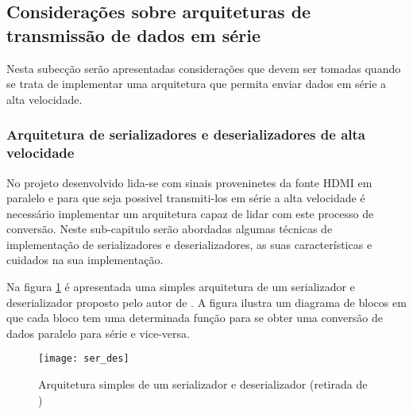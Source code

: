 %

\subsection{Considerações sobre arquiteturas de transmissão de dados em série} \label{serial_theory}
Nesta subecção serão apresentadas considerações que devem ser tomadas quando se trata de implementar uma arquitetura que permita enviar dados em série a alta velocidade.
\subsubsection*{Arquitetura de serializadores e deserializadores de alta velocidade}

No projeto desenvolvido lida-se com sinais proveninetes da fonte HDMI em paralelo e para que seja possivel transmiti-los em série a alta velocidade é necessário implementar um arquitetura capaz de lidar com este processo de conversão. Neste sub-capitulo serão abordadas algumas técnicas de implementação de serializadores e deserializadores, as suas características e cuidados na sua implementação.

Na figura \ref{fig:arquiteturaSER} é apresentada uma simples arquitetura de um serializador e deserializador proposto pelo autor de \cite{R032}. A figura ilustra um diagrama de blocos em que cada bloco tem uma determinada função para se obter uma conversão de dados paralelo para série e vice-versa.

\begin{figure}[h!]
	\begin{center}
		\leavevmode
		\texttt{[image: ser\_des]}
		\caption[Arquitetura simples de um serializador e deserializador]{Arquitetura simples de um serializador e deserializador (retirada de \cite{R032})}
		\label{fig:arquiteturaSER}
	\end{center}
\end{figure}

